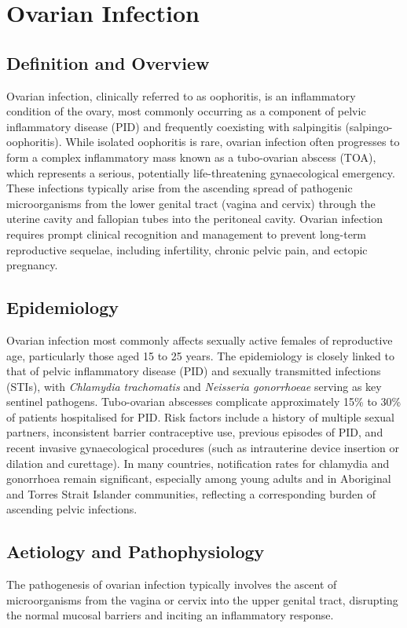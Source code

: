 \chapter{Ovarian Infection}

\section*{Definition and Overview}
Ovarian infection, clinically referred to as oophoritis, is an inflammatory condition of the ovary, most commonly occurring as a component of pelvic inflammatory disease (PID) and frequently coexisting with salpingitis (salpingo-oophoritis). While isolated oophoritis is rare, ovarian infection often progresses to form a complex inflammatory mass known as a tubo-ovarian abscess (TOA), which represents a serious, potentially life-threatening gynaecological emergency. These infections typically arise from the ascending spread of pathogenic microorganisms from the lower genital tract (vagina and cervix) through the uterine cavity and fallopian tubes into the peritoneal cavity. Ovarian infection requires prompt clinical recognition and management to prevent long-term reproductive sequelae, including infertility, chronic pelvic pain, and ectopic pregnancy.

\section*{Epidemiology}
Ovarian infection most commonly affects sexually active females of reproductive age, particularly those aged 15 to 25 years. The epidemiology is closely linked to that of pelvic inflammatory disease (PID) and sexually transmitted infections (STIs), with \textit{Chlamydia trachomatis} and \textit{Neisseria gonorrhoeae} serving as key sentinel pathogens. Tubo-ovarian abscesses complicate approximately 15\% to 30\% of patients hospitalised for PID. Risk factors include a history of multiple sexual partners, inconsistent barrier contraceptive use, previous episodes of PID, and recent invasive gynaecological procedures (such as intrauterine device insertion or dilation and curettage). In many countries, notification rates for chlamydia and gonorrhoea remain significant, especially among young adults and in Aboriginal and Torres Strait Islander communities, reflecting a corresponding burden of ascending pelvic infections.

\section*{Aetiology and Pathophysiology}
The pathogenesis of ovarian infection typically involves the ascent of microorganisms from the vagina or cervix into the upper genital tract, disrupting the normal mucosal barriers and inciting an inflammatory response.

